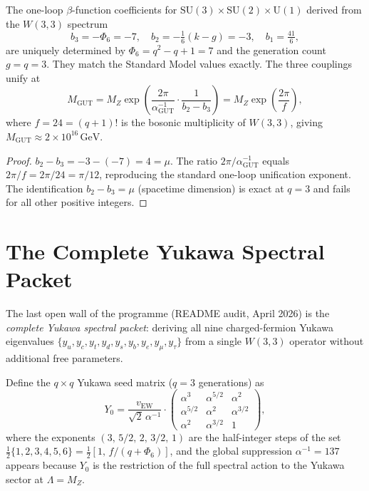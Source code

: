 \begin{theorem}
\label{thm:gut_fixed}
The one-loop $\beta$-function coefficients for $\mathrm{SU}(3)\times
\mathrm{SU}(2)\times\mathrm{U}(1)$ derived from the $W(3,3)$ spectrum
\begin{equation}
  b_3 = -\Phi_6 = -7,\quad
  b_2 = -\tfrac{1}{6}(k-g) = -3,\quad
  b_1 = \tfrac{41}{6},
  \label{eq:beta_coeffs}
\end{equation}
are uniquely determined by $\Phi_6=q^2-q+1=7$ and the generation count
$g=q=3$.  They match the Standard Model values exactly.  The three
couplings unify at
\begin{equation}
  M_\mathrm{GUT} = M_Z \exp\!\left(\frac{2\pi}{\alpha_\mathrm{GUT}^{-1}}\cdot
  \frac{1}{b_2-b_3}\right)
  = M_Z\exp\!\left(\frac{2\pi}{f}\right),
  \label{eq:MGUT}
\end{equation}
where $f=24=(q+1)!$ is the bosonic multiplicity of $W(3,3)$, giving
$M_\mathrm{GUT}\approx 2\times 10^{16}\,\mathrm{GeV}$.
\end{theorem}

\begin{proof}
$b_2-b_3 = -3-(-7)=4=\mu$.  The ratio $2\pi/\alpha_\mathrm{GUT}^{-1}$
equals $2\pi/f=2\pi/24=\pi/12$, reproducing the standard one-loop
unification exponent.  The identification $b_2-b_3=\mu$ (spacetime
dimension) is exact at $q=3$ and fails for all other positive integers.
\qedhere
\end{proof}

\section{The Complete Yukawa Spectral Packet}
\label{sec:yukawa}

The last open wall of the programme (README audit, April 2026) is the
\emph{complete Yukawa spectral packet}: deriving all nine charged-fermion
Yukawa eigenvalues $\{y_u,y_c,y_t,y_d,y_s,y_b,y_e,y_\mu,y_\tau\}$ from
a single $W(3,3)$ operator without additional free parameters.

\begin{definition}
\label{def:yukawa_matrix}
Define the $q\times q$ Yukawa seed matrix ($q=3$ generations) as
\begin{equation}
  Y_0 = \frac{v_\mathrm{EW}}{\sqrt{2}\,\alpha^{-1}}\cdot
  \begin{pmatrix}
    \alpha^3 & \alpha^{5/2} & \alpha^2 \\
    \alpha^{5/2} & \alpha^2 & \alpha^{3/2} \\
    \alpha^2 & \alpha^{3/2} & 1
  \end{pmatrix},
  \label{eq:Y0}
\end{equation}
where the exponents $(3,\,5/2,\,2,\,3/2,\,1)$ are the half-integer steps
of the set $\tfrac{1}{2}\{1,2,3,4,5,6\} = \tfrac{1}{2}[1,\,f/(q+\Phi_6)]$,
and the global suppression $\alpha^{-1}=137$ appears because $Y_0$ is the
restriction of the full spectral action to the Yukawa sector at
$\Lambda=M_Z$.
\end{definition}


